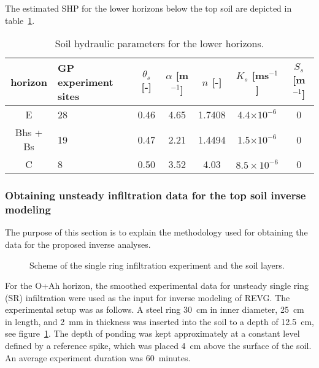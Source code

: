 \documentclass[review]{elsarticle}
\begin{document}
 



The estimated SHP for the lower horizons below the top soil are depicted in table~\ref{tab_SHP}.

\begin{table}[ht]
\begin{center}
\caption{Soil hydraulic parameters for the lower horizons.}
\begin{small}
\doublespacing
\begin{tabular}{c | p{2cm}| c c c c c}
\toprule
horizon &  GP experiment sites  & $\theta_s$ [-] & $\alpha$ [m$^{-1}$]& $n$ [-]& $K_s$ [ms$^{-1}$] & $S_s$ [m$^{-1}$] \\ \hline
E & 28 &  0.46&4.65&1.7408&4.4$\times 10^{-6}$ & 0\\
Bhs + Bs & 19  &0.47&2.21&1.4494&1.5$\times 10^{-6}$ & 0\\
C & 8 & 0.50 & 3.52 & 4.03 &  $8.5\times 10^{-6}$ & 0 \\
\toprule
\end{tabular}
\end{small}
\label{tab_SHP}
\end{center}
\end{table}


\subsubsection{Obtaining unsteady infiltration data for the top soil inverse modeling}
\label{krivka}

The purpose of this section is to explain the methodology used for obtaining the data for the proposed inverse analyses. 


 \begin{figure}
\centering
{}
 \caption{Scheme of the single ring infiltration experiment and the soil layers. }
 \label{experiment}
\end{figure}


For the O+Ah horizon, the smoothed experimental data for unsteady single ring (SR) infiltration were used as the input for inverse modeling of REVG.
The experimental setup was as follows. A steel ring 30~cm in inner diameter, 25~cm in length, and 2~mm in thickness was inserted into the soil to a depth of 12.5~cm, see figure~\ref{experiment}. The depth of ponding was kept approximately at a constant level defined by a reference spike, which was placed 4~cm above the surface of the soil.  An average experiment duration was 60~minutes.
\end{document}
